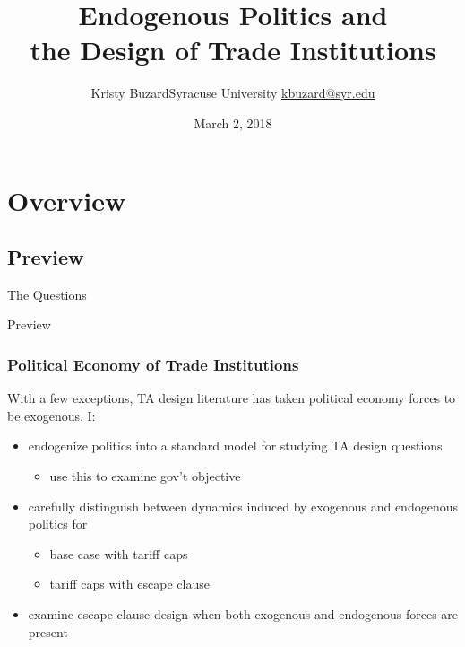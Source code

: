 \documentclass[handout]{beamer}
\title[Endogenous Politics and the Design of Trade Institutions\hspace{2.05in}\insertframenumber/\inserttotalframenumber]{Endogenous Politics and \\ the Design of Trade Institutions}
\author[Kristy Buzard]{\texorpdfstring{Kristy Buzard\newline Syracuse University \newline\url{kbuzard@syr.edu}}{Kristy Buzard}}
\date{March 2, 2018}
\begin{document}
\maketitle




\section{Overview}
\subsection{Preview}
\begin{frame}{The Questions}

\pause
{}

\end{frame}


\begin{frame}{Preview}
\frametitle{Political Economy of Trade Institutions}
\pause
With a few exceptions, TA design literature has taken political economy forces to be exogenous. I:
\pause
\begin{itemize}[<+->]
	\item endogenize politics into a standard model for studying TA design questions
		\begin{itemize}
			\item use this to examine gov't objective
		\end{itemize}
	\item carefully distinguish between dynamics induced by exogenous and endogenous politics for
		\begin{itemize}[<+->]
			\item base case with tariff caps
			\item tariff caps with escape clause
		\end{itemize}
	\item examine escape clause design when both exogenous and endogenous forces are present
\end{itemize}
\end{frame}
\end{document}

